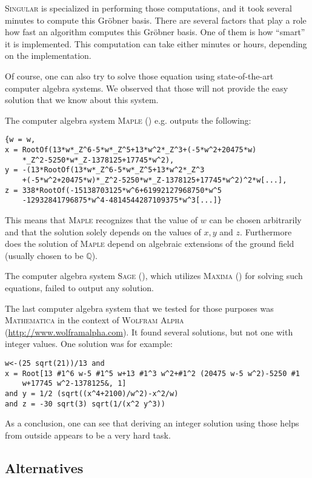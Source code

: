 \documentclass[oribibl]{llncs}
\newcommand{\QQ}{{\mathbb{Q}}}
\begin{document}
\textsc{Singular} is specialized in performing those computations, and
it took several minutes to compute this Gr\"obner basis. There are
several factors that play a role how fast an algorithm computes this
Gr\"obner basis. One of them is how ``smart'' it is implemented. This
computation can take either minutes or hours, depending on the implementation.

Of course, one can also try to solve those equation using
state-of-the-art computer algebra systems. We observed that those will
not provide the easy solution that we know about this system.

The computer algebra system \textsc{Maple} (\cite{Maple}) e.g. outputs the following:
\begin{verbatim}
{w = w,
x = RootOf(13*w*_Z^6-5*w*_Z^5+13*w^2*_Z^3+(-5*w^2+20475*w)
    *_Z^2-5250*w*_Z-1378125+17745*w^2),
y = -(13*RootOf(13*w*_Z^6-5*w*_Z^5+13*w^2*_Z^3
    +(-5*w^2+20475*w)*_Z^2-5250*w*_Z-1378125+17745*w^2)^2*w[...],
z = 338*RootOf(-15138703125*w^6+61992127968750*w^5
    -12932841796875*w^4-4814544287109375*w^3[...]}
\end{verbatim}

This means that \textsc{Maple} recognizes that the value of $w$ can be
chosen arbitrarily and that the solution solely depends on the values
of $x,y$ and $z$. Furthermore does the solution of \textsc{Maple}
depend on algebraic extensions of the ground field (usually chosen to
be $\QQ$).

The computer algebra system \textsc{Sage} (\cite{sage}), which utilizes
\textsc{Maxima} (\cite{maxima}) for solving such equations, failed to
output any solution.

The last computer algebra system that we tested for those purposes was
\textsc{Mathematica} \cite{wolfram1999mathematica} in the context of
\textsc{Wolfram Alpha}\\ (\url{http://www.wolframalpha.com}). It found
several solutions, but not one with integer values. One solution was
for example:
\begin{verbatim}
w<-(25 sqrt(21))/13 and 
x = Root[13 #1^6 w-5 #1^5 w+13 #1^3 w^2+#1^2 (20475 w-5 w^2)-5250 #1
    w+17745 w^2-1378125&, 1]
and y = 1/2 (sqrt((x^4+2100)/w^2)-x^2/w)
and z = -30 sqrt(3) sqrt(1/(x^2 y^3))
\end{verbatim}

As a conclusion, one can see that deriving an integer solution using
those helps from outside appears to be a very hard task.

\subsection{Alternatives}
\end{document}
